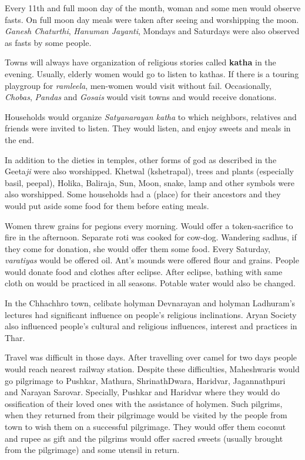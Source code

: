 Every 11th and full moon day of the month, woman and some men would observe
fasts. On full moon day meals were taken after seeing and worshipping the moon.
\textit{Ganesh Chaturthi}, \textit{Hanuman Jayanti}, Mondays and Saturdays were
also observed as fasts by some people.

Towns will always have organization of religious stories called \textbf{katha}
in the evening. Usually, elderly women would go to listen to kathas. If there
is a touring playgroup for \textit{ramleela}, men-women would visit without
fail. Occasionally, \textit{Chobas}, \textit{Pandas} and \textit{Gosais} would
visit towns and would receive donations.

Households would organize \textit{Satyanarayan katha} to which neighbors,
relatives and friends were invited to listen. They would listen, and enjoy
sweets and meals in the end.

In addition to the dieties in temples, other forms of god as described in the
Geeta\textit{ji} were also worshipped. Khetwal (kshetrapal), trees and plants
(especially basil, peepal), Holika, Baliraja, Sun, Moon, snake, lamp and other
symbols were also worshipped. Some households had a  (place) for
their ancestors and they would put aside some food for them before eating
meals.

Women threw grains for pegions every morning. Would offer a token-sacrifice to
fire in the afternoon. Separate roti was cooked for cow-dog. Wandering sadhus,
if they come for donation, she would offer them some food. Every Saturday,
\textit{varatiyas} would be offered oil. Ant's mounds were offered flour
and grains. People would donate food and clothes after eclipse. After
eclipse, bathing with same cloth on would be practiced in all seasons.
Potable water would also be changed.

In the Chhachhro town, celibate holyman Devnarayan and holyman Ladhuram's
lectures had significant influence on people's religious inclinations. Aryan
Society also influenced people's cultural and religious influences, interest
and practices in Thar.

Travel was difficult in those days. After travelling over camel for two days
people would reach nearest railway station. Despite these difficulties,
Maheshwaris would go pilgrimage to Pushkar, Mathura, ShrinathDwara, Haridvar,
Jagannathpuri and Narayan Sarovar. Specially, Pushkar and Haridvar where they
would do ossification of their loved ones with the assistance of holymen. Such
pilgrims, when they returned from their pilgrimage would be visited by the
people from town to wish them on a successful pilgrimage. They would offer them
coconut and rupee as gift and the pilgrims would offer sacred sweets (usually
brought from the pilgrimage) and some utensil in return.

